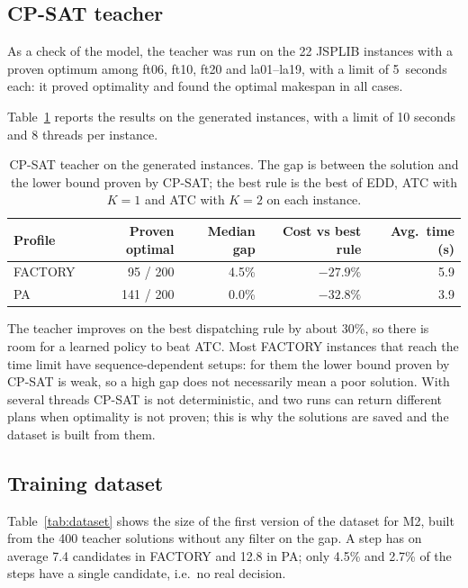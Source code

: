 \subsection{CP-SAT teacher}
\label{sec:eval-teacher}

As a check of the model, the teacher was run on the 22 JSPLIB instances with a proven optimum
among ft06, ft10, ft20 and la01--la19, with a limit of 5~seconds each: it proved optimality and
found the optimal makespan in all cases.

Table~\ref{tab:teacher} reports the results on the generated instances, with a limit of 10
seconds and 8 threads per instance.

\begin{table}[htpb]
  \centering
  \small
  \begin{tabular}{@{}lrrrr@{}}
    \toprule
    \textbf{Profile} & \textbf{Proven optimal} & \textbf{Median gap} & \textbf{Cost vs best rule}
      & \textbf{Avg.\ time (s)} \\
    \midrule
    FACTORY & 95 / 200  & 4.5\% & $-27.9\%$ & 5.9 \\
    PA      & 141 / 200 & 0.0\% & $-32.8\%$ & 3.9 \\
    \bottomrule
  \end{tabular}
  \caption{CP-SAT teacher on the generated instances. The gap is between the solution and the
           lower bound proven by CP-SAT; the best rule is the best of EDD, ATC with $K=1$ and ATC
           with $K=2$ on each instance.}
  \label{tab:teacher}
\end{table}

The teacher improves on the best dispatching rule by about 30\%, so there is room for a learned
policy to beat ATC. Most FACTORY instances that reach the time limit have sequence-dependent
setups: for them the lower bound proven by CP-SAT is weak, so a high gap does not necessarily
mean a poor solution. With several threads CP-SAT is not deterministic, and two runs can return
different plans when optimality is not proven; this is why the solutions are saved and the
dataset is built from them.

\subsection{Training dataset}
\label{sec:eval-dataset}

Table~\ref{tab:dataset} shows the size of the first version of the dataset for M2, built from
the 400 teacher solutions without any filter on the gap. A step has on average 7.4 candidates in
FACTORY and 12.8 in PA; only 4.5\% and 2.7\% of the steps have a single candidate, i.e.\ no
real decision.

